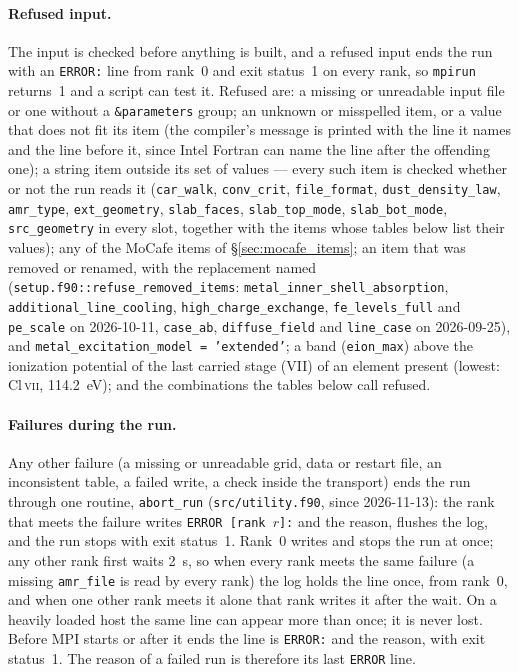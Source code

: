\documentclass[english,a4paper]{my_memo}
\newcommand{\code}[1]{\texttt{#1}}
\begin{document}
\paragraph{Refused input.}  The input is checked before anything is built,
and a refused input ends the run with an \code{ERROR:} line from rank~0 and
exit status~1 on every rank, so \code{mpirun} returns~1 and a script can
test it.  Refused are: a missing or unreadable input file or one without a
\code{\&parameters} group; an unknown or misspelled item, or a value that
does not fit its item (the compiler's message is printed with the line it
names and the line before it, since Intel Fortran can name the line after
the offending one); a string item outside its set of values --- every such
item is checked whether or not the run reads it (\code{car\_walk},
\code{conv\_crit}, \code{file\_format}, \code{dust\_density\_law},
\code{amr\_type}, \code{ext\_geometry}, \code{slab\_faces},
\code{slab\_top\_mode}, \code{slab\_bot\_mode}, \code{src\_geometry}
in every slot, together with the items whose tables below list their
values); any of the MoCafe items of \S\ref{sec:mocafe_items}; an item
that was removed or renamed, with the replacement named
(\code{setup.f90::refuse\_removed\_items}: \code{metal\_inner\_shell\_absorption},
\code{additional\_line\_cooling}, \code{high\_charge\_exchange},
\code{fe\_levels\_full} and \code{pe\_scale} on 2026-10-11, \code{case\_ab},
\code{diffuse\_field} and \code{line\_case} on 2026-09-25), and
\code{metal\_excitation\_model = 'extended'}; a band (\code{eion\_max})
above the ionization potential of the last carried stage (VII) of an
element present (lowest: Cl\,\textsc{vii}, 114.2~eV); and the
combinations the tables below call refused.

\paragraph{Failures during the run.}  Any other failure (a missing or
unreadable grid, data or restart file, an inconsistent table, a failed
write, a check inside the transport) ends the run through one routine,
\code{abort\_run} (\code{src/utility.f90}, since 2026-11-13): the rank
that meets the failure writes \code{ERROR [rank }$r$\code{]:} and the
reason, flushes the log, and the run stops with exit status~1.  Rank~0
writes and stops the run at once; any other rank first waits 2~s, so when
every rank meets the same failure (a missing \code{amr\_file} is read by
every rank) the log holds the line once, from rank~0, and when one other
rank meets it alone that rank writes it after the wait.  On a heavily
loaded host the same line can appear more than once; it is never lost.
Before MPI starts or after it ends the line is \code{ERROR:} and the reason,
with exit status~1.  The reason of a failed run is therefore its last
\code{ERROR} line.
\end{document}

